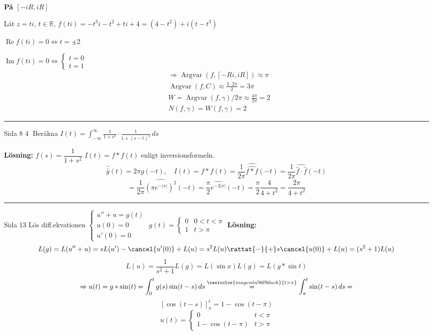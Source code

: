 \textbf{På $[-iR, iR]$}

Låt $z = ti$, $t \in \mathbb{R}$, $f(ti) = -t^3 i - t^2 + ti + 4 = (4 - t^2) + i(t - t^3)$

$\operatorname{Re} f(ti) = 0 \Leftrightarrow t = \pm 2$

$\operatorname{Im} f(ti) = 0 \Leftrightarrow \begin{cases} t = 0 \\ t = 1 \end{cases}$
\begin{align*}
  &\Rightarrow \operatorname{Arg var}(f, [-Ri, iR]) \approx \pi \\
  &\operatorname{Arg var}(f, C) \approx \frac{3 \cdot 2\pi}{2} = 3\pi \\
  &W = \operatorname{Arg var}(f, \gamma)/2\pi \approx \frac{4\pi}{2\pi} = 2 \\
  &N(f, \gamma) = W(f, \gamma) = 2
\end{align*}

\noindent\rule{\linewidth}{0.4pt}

Sida 8 \textcircled{4} Beräkna $I(t) = \displaystyle\int_{-\infty}^\infty \frac{1}{1 + s^2} \cdot \frac{1}{1 + (s - t)^2}\,ds$

\textbf{Lösning:} $f(s) = \dfrac{1}{1 + s^2}$ \quad $I(t) = f * f(t)$ enligt inversionsformeln.
\[ \hat{\hat{g}}(t) = 2\pi g(-t), \quad I(t) = f * f(t) = \frac{1}{2\pi} \hat{\widehat{f * f}}(-t) = \frac{1}{2\pi} \widehat{\hat{f} \cdot \hat{f}}(-t) \]
\[ = \frac{1}{2\pi} \widehat{(\pi e^{-|x|})^2}(-t) = \frac{\pi}{2} \widehat{e^{-2|x|}}(-t) = \frac{\pi}{2} \frac{4}{4 + t^2} = \frac{2\pi}{4 + t^2} \]

\noindent\rule{\linewidth}{0.4pt}

Sida 13 \quad Lös diff.ekvationen $\begin{cases} u'' + u = g(t) \\ u(0) = 0 \\ u'(0) = 0 \end{cases}$ \quad $g(t) = \begin{cases} 0 & 0 < t < \pi \\ 1 & t > \pi \end{cases}$
\textbf{Lösning:}
\[ L(g) = L(u'' + u) = sL(u') - \cancel{u'(0)} + L(u) = s^2 L(u) \rattat{-}{+} s\cancel{u(0)} + L(u) = (s^2 + 1)L(u) \]
\[ L(u) = \frac{1}{s^2 + 1} L(g) = L(\sin x)L(g) = L(g * \sin t) \]
\[ \Rightarrow u(t) = g * \sin(t) = \int_0^t g(s)\sin(t - s)\,ds \overset{\textcolor{magenta!80!black}{t > \pi}}{=} \int_\pi^t \sin(t - s)\,ds = \]
\[ [\cos(t - s)]_\pi^t = 1 - \cos(t - \pi) \]
\[ u(t) = \begin{cases} 0 & t < \pi \\ 1 - \cos(t - \pi) & t > \pi \end{cases} \]
